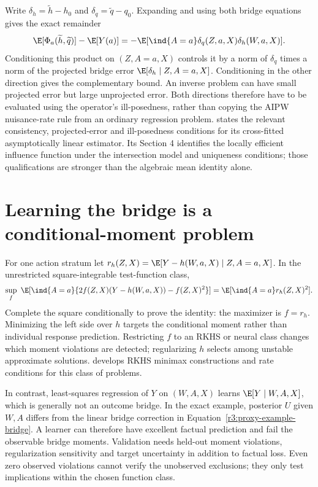 Write $\delta_h=\widetilde h-h_0$ and
$\delta_q=\widetilde q-q_0$. Expanding and using both bridge
equations gives the exact remainder
\begin{equation}
 \E[\Phi_a(\widetilde h,\widetilde q)]-\E[Y(a)]
 =-\E[\ind\{A=a\}\delta_q(Z,a,X)\delta_h(W,a,X)].
 \label{r3:proximal-remainder}
\end{equation}
Conditioning this product on $(Z,A=a,X)$ controls it by a norm of
$\delta_q$ times a norm of the projected bridge error
$\E[\delta_h\mid Z,A=a,X]$. Conditioning in the other direction
gives the complementary bound. An inverse problem can have small
projected error but large unprojected error. Both directions therefore
have to be evaluated using the operator's ill-posedness, rather than
copying the AIPW nuisance-rate rule from an ordinary regression problem.
\citet[Section 3.2, Assumptions 2--3 and Theorem 2]{ghassami2022}
states the relevant consistency, projected-error and ill-posedness
conditions for its cross-fitted asymptotically linear estimator.
Its Section 4 identifies the locally efficient influence function
under the intersection model and uniqueness conditions; those
qualifications are stronger than the algebraic mean identity alone.

\section{Learning the bridge is a conditional-moment problem}
\label{r3:bridge-learning}
For one action stratum let
$r_h(Z,X)=\E[Y-h(W,a,X)\mid Z,A=a,X]$. In the unrestricted
square-integrable test-function class,
\begin{align}
 \sup_f\ \E[\ind\{A=a\}
       \{2f(Z,X)(Y-h(W,a,X))-f(Z,X)^2\}]
 =\E[\ind\{A=a\}r_h(Z,X)^2].
 \label{r3:minimax-moment}
\end{align}
Complete the square conditionally to prove the identity: the maximizer
is $f=r_h$. Minimizing the left side over $h$ targets the conditional
moment rather than individual response prediction. Restricting $f$ to
an RKHS or neural class changes which moment violations are detected;
regularizing $h$ selects among unstable approximate solutions.
\citet[Sections 3 and 5]{ghassami2022} develops RKHS minimax
constructions and rate conditions for this class of problems.

In contrast, least-squares regression of $Y$ on $(W,A,X)$ learns
$\E[Y\mid W,A,X]$, which is generally not an outcome bridge. In
the exact example, posterior $U$ given $W,A$ differs from the linear
bridge correction in Equation~\eqref{r3:proxy-example-bridge}. A
learner can therefore have excellent factual prediction and fail the
observable bridge moments. Validation needs held-out moment violations,
regularization sensitivity and target uncertainty in addition to factual
loss. Even zero observed violations cannot verify the unobserved
exclusions; they only test implications within the chosen function class.

